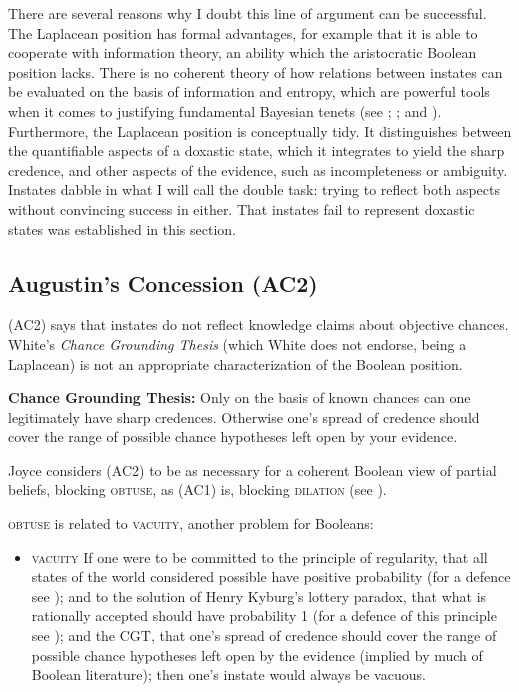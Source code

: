 \documentclass[12pt]{article}
\begin{document}
There are several reasons why I doubt this line of argument can be
successful. The Laplacean position has formal advantages, for example
that it is able to cooperate with information theory, an ability which
the aristocratic Boolean position lacks. There is no coherent theory
of how relations between instates can be evaluated on the basis of
information and entropy, which are powerful tools when it comes to
justifying fundamental Bayesian tenets (see
; ; and
). Furthermore, the Laplacean position is
conceptually tidy. It distinguishes between the quantifiable aspects
of a doxastic state, which it integrates to yield the sharp credence,
and other aspects of the evidence, such as incompleteness or
ambiguity. Instates dabble in what I will call the double task: trying
to reflect both aspects without convincing success in either. That
instates fail to represent doxastic states was established in this
section.

\subsection{Augustin's Concession (AC2)}
\label{jj2}

(AC2) says that instates do not reflect knowledge claims about
objective chances. White's \emph{Chance Grounding Thesis} (which White
does not endorse, being a Laplacean) is not an appropriate
characterization of the Boolean position.

\begin{quotex}
  \textbf{Chance Grounding Thesis:} Only on the basis of known chances
  can one legitimately have sharp credences. Otherwise one's spread of
  credence should cover the range of possible chance hypotheses left
  open by your evidence. 
\end{quotex}

Joyce considers (AC2) to be as necessary for a coherent Boolean view
of partial beliefs, blocking \textsc{obtuse}, as (AC1) is, blocking
\textsc{dilation} (see ). 

\textsc{obtuse} is related to \textsc{vacuity}, another problem for
Booleans:

\begin{itemize}
\item \textsc{vacuity} If one were to be committed to the principle of
  regularity, that all states of the world considered possible have
  positive probability (for a defence see
  ); and to the solution of Henry
  Kyburg's lottery paradox, that what is rationally accepted should
  have probability 1 (for a defence of this principle see
  ); and the CGT, that one's spread of
  credence should cover the range of possible chance hypotheses left
  open by the evidence (implied by much of Boolean literature); then
  one's instate would always be vacuous.
\end{itemize}
\end{document}
